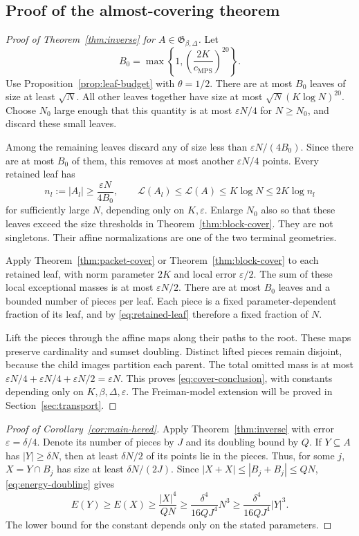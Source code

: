 \documentclass[11pt,reqno]{amsart}
\numberwithin{equation}{section}
\theoremstyle{definition}
\theoremstyle{remark}
\newcommand{\La}{\mathcal L}
\newcommand{\eps}{\varepsilon}
\newcommand{\cMPS}{c_{\mathrm{MPS}}}
\begin{document}
\subsection{Proof of the almost-covering theorem}

\begin{proof}[Proof of Theorem~\ref{thm:inverse} for $A\in\mathfrak G_{\beta,\Delta}$]
Let
\[
 B_0=\max\left\{1,\left(\frac{2K}{\cMPS}\right)^{20}\right\}.
\]
Use Proposition~\ref{prop:leaf-budget} with $\theta=1/2$. There are
at most $B_0$ leaves of size at least $\sqrt N$. All other leaves
together have size at most $\sqrt N(K\log N)^{20}$. Choose $N_0$ large
enough that this quantity is at most $\eps N/4$ for $N\ge N_0$, and
discard these small leaves.

Among the remaining leaves discard any of size less than
$\eps N/(4B_0)$. Since there are at most $B_0$ of them, this removes
at most another $\eps N/4$ points. Every retained leaf has
\begin{equation}\label{eq:retained-leaf}
 n_l:=|A_l|\ge\frac{\eps N}{4B_0},\qquad
 \La(A_l)\le\La(A)\le K\log N\le2K\log n_l
\end{equation}
for sufficiently large $N$, depending only on $K,\eps$.
Enlarge $N_0$ also so that these leaves exceed the size thresholds in
Theorem~\ref{thm:block-cover}. They are not singletons. Their affine
normalizations are one of the two terminal geometries.

Apply Theorem~\ref{thm:packet-cover} or
Theorem~\ref{thm:block-cover} to each retained leaf, with norm parameter
$2K$ and local error $\eps/2$. The sum of these local exceptional
masses is at most $\eps N/2$. There are at most $B_0$ leaves and a
bounded number of pieces per leaf. Each piece is a fixed
parameter-dependent fraction of its leaf, and by
\eqref{eq:retained-leaf} therefore a fixed fraction of $N$.

Lift the pieces through the affine maps along their paths to the root.
These maps preserve cardinality and sumset doubling. Distinct lifted
pieces remain disjoint, because the child images partition each parent.
The total omitted mass is at most
$\eps N/4+\eps N/4+\eps N/2=\eps N$. This proves
\eqref{eq:cover-conclusion}, with constants depending only on
$K,\beta,\Delta,\eps$. The Freiman-model extension will be proved in
Section~\ref{sec:transport}.
\end{proof}

\begin{proof}[Proof of Corollary~\ref{cor:main-hered}]
Apply Theorem~\ref{thm:inverse} with error $\eps=\delta/4$. Denote its
number of pieces by $J$ and its doubling bound by $Q$. If
$Y\subseteq A$ has $|Y|\ge\delta N$, then at least $\delta N/2$ of
its points lie in the pieces. Thus, for some $j$,
$X=Y\cap B_j$ has size at least $\delta N/(2J)$. Since
$|X+X|\le|B_j+B_j|\le QN$, \eqref{eq:energy-doubling} gives
\[
 E(Y)\ge E(X)\ge\frac{|X|^4}{QN}
       \ge\frac{\delta^4}{16QJ^4}N^3
       \ge\frac{\delta^4}{16QJ^4}|Y|^3.
\]
The lower bound for the constant depends only on the stated parameters.
\end{proof}
\end{document}
